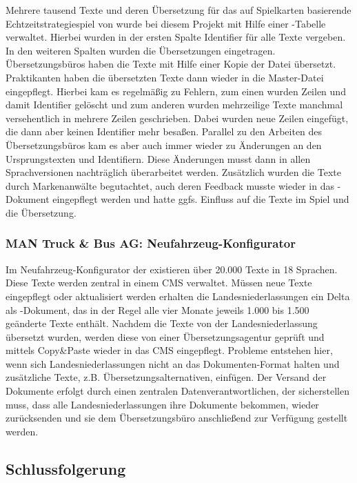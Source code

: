 Mehrere tausend Texte und deren Übersetzung für das auf Spielkarten basierende Echtzeitstrategiespiel  von  wurde bei diesem Projekt mit Hilfe einer -Tabelle verwaltet. Hierbei wurden in der ersten Spalte Identifier für alle Texte vergeben. In den weiteren Spalten wurden die Übersetzungen eingetragen. Übersetzungsbüros haben die Texte mit Hilfe einer Kopie der Datei übersetzt. Praktikanten haben die übersetzten Texte dann wieder in die Master-Datei eingepflegt. Hierbei kam es regelmäßig zu Fehlern, zum einen wurden Zeilen und damit Identifier gelöscht und zum anderen wurden mehrzeilige Texte manchmal versehentlich in mehrere Zeilen geschrieben. Dabei wurden neue Zeilen eingefügt, die dann aber keinen Identifier mehr besaßen. Parallel zu den Arbeiten des Übersetzungsbüros kam es aber auch immer wieder zu Änderungen an den Ursprungstexten und Identifiern. Diese Änderungen musst dann in allen Sprachversionen nachträglich überarbeitet werden. Zusätzlich wurden die Texte durch Markenanwälte begutachtet, auch deren Feedback musste wieder in das -Dokument eingepflegt werden und hatte ggfs. Einfluss auf die Texte im Spiel und die Übersetzung.

\subsubsection{MAN Truck \& Bus AG: Neufahrzeug-Konfigurator}

Im Neufahrzeug-Konfigurator der  existieren über 20.000 Texte in 18 Sprachen. Diese Texte werden zentral in einem CMS verwaltet. Müssen neue Texte eingepflegt oder aktualisiert werden erhalten die Landesniederlassungen ein Delta als -Dokument, das in der Regel alle vier Monate jeweils 1.000 bis 1.500 geänderte Texte enthält. Nachdem die Texte von der Landesniederlassung übersetzt wurden, werden diese von einer Übersetzungsagentur geprüft und mittels Copy\&Paste wieder in das CMS eingepflegt.  Probleme entstehen hier, wenn sich Landesniederlassungen nicht an das Dokumenten-Format halten und zusätzliche Texte, z.B. Übersetzungsalternativen, einfügen. Der Versand der Dokumente erfolgt durch einen zentralen Datenverantwortlichen, der sicherstellen muss, dass alle Landesniederlassungen ihre Dokumente bekommen, wieder zurücksenden und sie dem Übersetzungsbüro anschließend zur Verfügung gestellt werden.

\subsection{Schlussfolgerung}\label{l:schlussfolgerung}

